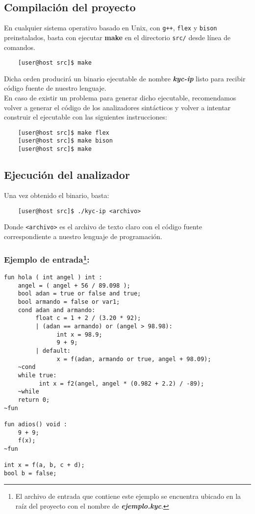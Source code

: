 \documentclass[12pt]{article}
\begin{document}
\subsection{Compilación del proyecto}

En cualquier sistema operativo basado en Unix, con \texttt{g++}, \texttt{flex} y \texttt{bison} preinstalados, basta con ejecutar \textbf{make} en el directorio \texttt{src/} desde línea de comandos.

\begin{verbatim}
    [user@host src]$ make
\end{verbatim}

Dicha orden producirá un binario ejecutable de nombre \textit{\textbf{kyc-ip}} listo para recibir código fuente de nuestro lenguaje.\\

En caso de existir un problema para generar dicho ejecutable, recomendamos volver a generar el código de los analizadores sintácticos y volver a intentar construir el ejecutable con las siguientes instrucciones:

\begin{verbatim}
    [user@host src]$ make flex
    [user@host src]$ make bison
    [user@host src]$ make
\end{verbatim}


\subsection{Ejecución del analizador} 

Una vez obtenido el binario, basta:
\begin{verbatim}
    [user@host src]$ ./kyc-ip <archivo>
\end{verbatim}
Donde \texttt{<archivo>} es el archivo de texto claro con el código fuente correspondiente a nuestro lenguaje de programación.



\subsubsection*{Ejemplo de entrada\footnote{El archivo de entrada que contiene este ejemplo se encuentra ubicado en la raíz del proyecto con el nombre de \textbf{\textit{ejemplo.kyc}}. }:}
\begin{verbatim}
fun hola ( int angel ) int : 
    angel = ( angel + 56 / 89.098 );
    bool adan = true or false and true;
    bool armando = false or var1;
    cond adan and armando:
         float c = 1 + 2 / (3.20 * 92);
         | (adan == armando) or (angel > 98.98):
               int x = 98.9;
               9 + 9;
         | default:
               x = f(adan, armando or true, angel + 98.09);            
    ~cond
    while true:
          int x = f2(angel, angel * (0.982 + 2.2) / -89);            
    ~while
    return 0;
~fun

fun adios() void :
    9 + 9;
    f(x);
~fun

int x = f(a, b, c + d);
bool b = false;
\end{verbatim}
\end{document}
